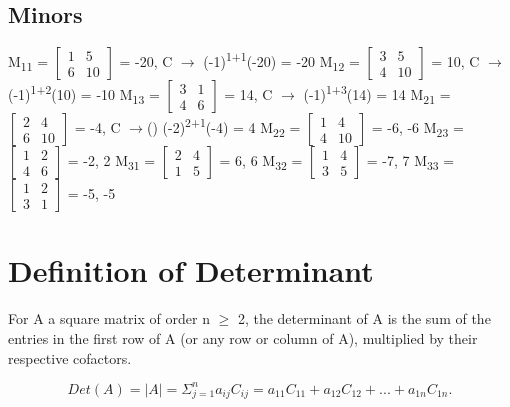 \documentclass[11pt]{article}
\begin{document}
\subsection{Minors}
\label{sec:orgbddb19d}
M\textsubscript{11} = \(\begin{bmatrix}1&5\\6&10\end{bmatrix}\) = -20, C \(\rightarrow\) (-1)\textsuperscript{1+1}(-20) = -20
M\textsubscript{12} = \(\begin{bmatrix}3&5\\4&10\end{bmatrix}\) = 10, C \(\rightarrow\) (-1)\textsuperscript{1+2}(10) = -10
M\textsubscript{13} = \(\begin{bmatrix}3&1\\4&6\end{bmatrix}\) = 14, C \(\rightarrow\) (-1)\textsuperscript{1+3}(14) = 14
M\textsubscript{21} = \(\begin{bmatrix}2&4\\6&10\end{bmatrix}\) = -4, C \(\rightarrow\)() (-2)\textsuperscript{2+1}(-4) = 4
M\textsubscript{22} = \(\begin{bmatrix}1&4\\4&10\end{bmatrix}\) = -6, -6
M\textsubscript{23} = \(\begin{bmatrix}1&2\\4&6\end{bmatrix}\) = -2, 2
M\textsubscript{31} = \(\begin{bmatrix}2&4\\1&5\end{bmatrix}\) = 6, 6
M\textsubscript{32} = \(\begin{bmatrix}1&4\\3&5\end{bmatrix}\) = -7, 7
M\textsubscript{33} = \(\begin{bmatrix}1&2\\3&1\end{bmatrix}\) = -5, -5
\section{Definition of Determinant}
\label{sec:org6f44865}
For A a square matrix of order n \(\ge\) 2, the determinant of A is the sum of the entries in the first row of A (or any row or column of A), multiplied by their respective cofactors.

\[
Det(A) = |A| = \Sigma_{j=1}^{n}a_{ij}C_{ij} = a_{11}C_{11} + a_{12}C_{12} + ... + a_{1n}C_{1n}.
\]
\end{document}
